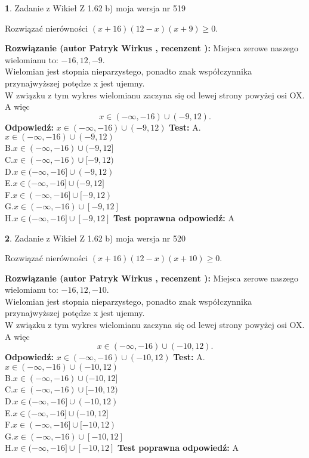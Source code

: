 \documentclass[12pt, a4paper]{article}
\theoremstyle{definition} %
\newtheorem{zad}{}
\newcommand{\zadStart}[1]{\begin{zad}#1\newline}
\newcommand{\zadStop}{\end{zad}}
\newcommand{\rozwStart}[2]{\noindent \textbf{Rozwiązanie (autor #1 , recenzent #2): }\newline}
\newcommand{\rozwStop}{\newline}
\newcommand{\odpStart}{\noindent \textbf{Odpowiedź:}\newline}
\newcommand{\odpStop}{\newline}
\newcommand{\testStart}{\noindent \textbf{Test:}\newline}
\newcommand{\testStop}{\newline}
\newcommand{\kluczStart}{\noindent \textbf{Test poprawna odpowiedź:}\newline}
\newcommand{\kluczStop}{\newline}
\begin{document}
\zadStart{Zadanie z Wikieł Z 1.62 b) moja wersja nr 519}

Rozwiązać nierówności $(x+16)(12-x)(x+9)\ge0$.
\zadStop
\rozwStart{Patryk Wirkus}{}
Miejsca zerowe naszego wielomianu to: $-16, 12, -9$.\\
Wielomian jest stopnia nieparzystego, ponadto znak współczynnika przy\linebreak najwyższej potędze x jest ujemny.\\ W związku z tym wykres wielomianu zaczyna się od lewej strony powyżej osi OX. A więc $$x \in (-\infty,-16) \cup (-9,12).$$
\rozwStop
\odpStart
$x \in (-\infty,-16) \cup (-9,12)$
\odpStop
\testStart
A.$x \in (-\infty,-16) \cup (-9,12)$\\
B.$x \in (-\infty,-16) \cup (-9,12]$\\
C.$x \in (-\infty,-16) \cup [-9,12)$\\
D.$x \in (-\infty,-16] \cup (-9,12)$\\
E.$x \in (-\infty,-16] \cup (-9,12]$\\
F.$x \in (-\infty,-16] \cup [-9,12)$\\
G.$x \in (-\infty,-16) \cup [-9,12]$\\
H.$x \in (-\infty,-16] \cup [-9,12]$
\testStop
\kluczStart
A
\kluczStop



\zadStart{Zadanie z Wikieł Z 1.62 b) moja wersja nr 520}

Rozwiązać nierówności $(x+16)(12-x)(x+10)\ge0$.
\zadStop
\rozwStart{Patryk Wirkus}{}
Miejsca zerowe naszego wielomianu to: $-16, 12, -10$.\\
Wielomian jest stopnia nieparzystego, ponadto znak współczynnika przy\linebreak najwyższej potędze x jest ujemny.\\ W związku z tym wykres wielomianu zaczyna się od lewej strony powyżej osi OX. A więc $$x \in (-\infty,-16) \cup (-10,12).$$
\rozwStop
\odpStart
$x \in (-\infty,-16) \cup (-10,12)$
\odpStop
\testStart
A.$x \in (-\infty,-16) \cup (-10,12)$\\
B.$x \in (-\infty,-16) \cup (-10,12]$\\
C.$x \in (-\infty,-16) \cup [-10,12)$\\
D.$x \in (-\infty,-16] \cup (-10,12)$\\
E.$x \in (-\infty,-16] \cup (-10,12]$\\
F.$x \in (-\infty,-16] \cup [-10,12)$\\
G.$x \in (-\infty,-16) \cup [-10,12]$\\
H.$x \in (-\infty,-16] \cup [-10,12]$
\testStop
\kluczStart
A
\kluczStop
\end{document}
